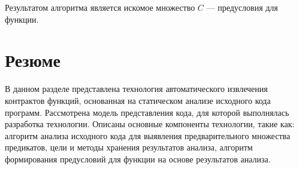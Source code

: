 Результатом алгоритма является искомое множество $C$ --- предусловия для функции.

\section{Резюме}
В данном разделе представлена технология автоматического извлечения контрактов функций, основанная на статическом анализе исходного кода программ. Рассмотрена модель представления кода, для которой выполнялась разработка технологии. Описаны основные компоненты технологии, такие как: алгоритм анализа исходного кода для выявления предварительного множества предикатов, цели и методы хранения результатов анализа, алгоритм формирования предусловий для функции на основе результатов анализа.